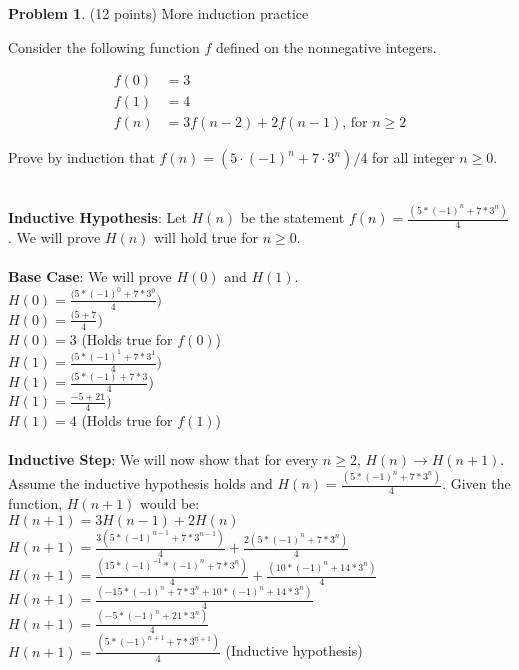 \documentclass[11pt]{article}
\theoremstyle{definition}
\theoremstyle{theorem}
\newtheorem{prob}{Problem}
\newcommand{\solution}[1]{\medskip\noindent{\color{DarkBlue}\textbf{Solution:}} #1}
\newcommand{\solution}[1]{}
\begin{document}
\newpage

\begin{prob}
  (12 points) More induction practice
\end{prob}

Consider the following function $f$ defined on the nonnegative integers.

\begin{align*}
	f(0) & = 3\\
	f(1) & = 4\\
	f(n) & = 3f(n-2) + 2f(n-1)\text{, for $n\ge 2$}
\end{align*}

Prove by induction that $f(n)= (5\cdot (-1)^n + 7\cdot 3^n) / 4$ for all integer $n\ge 0$.

\solution{
\\ \textbf{Inductive Hypothesis}: Let $H(n)$ be the statement $f(n) = \frac{(5 * (-1)^{n} + 7 * 3^{n})}{4}$. We will prove $H(n)$ will hold true for $n \ge 0$. \\\\
\textbf{Base Case}: We will prove $H(0)$ and $H(1)$. \\
$H(0) = \frac{(5 * (-1)^{0} + 7 * 3^{0}}{4})$ \\
$H(0) = \frac{(5 + 7}{4})$ \\
$H(0) = 3$ (Holds true for $f(0)$) \\
$H(1) = \frac{(5 * (-1)^{1} + 7 * 3^{1}}{4})$ \\
$H(1) = \frac{(5 * (-1) + 7 * 3}{4})$ \\
$H(1) = \frac{-5 + 21}{4})$ \\
$H(1) = 4$ (Holds true for $f(1)$) \\\\
\textbf{Inductive Step}: We will now show that for every $n \ge 2$, $H(n) \rightarrow H(n + 1)$. Assume the inductive hypothesis holds and $H(n) = \frac{(5 * (-1)^{n} + 7 * 3^{n})}{4}$. Given the function, $H(n + 1)$ would be: \\
$H(n + 1) = 3H(n - 1) + 2H(n)$ \\
$H(n + 1) = \frac{3(5 * (-1)^{n - 1} + 7 * 3^{n - 1})}{4} + \frac{2(5 * (-1)^{n} + 7 * 3^{n})}{4}$ \\
$H(n + 1) = \frac{(15 * (-1)^{-1} * (-1)^{n} + 7 * 3^{n})}{4} + \frac{(10 * (-1)^{n} + 14 * 3^{n})}{4}$ \\
$H(n + 1) = \frac{(-15 * (-1)^{n} + 7 * 3^{n} + 10 * (-1)^{n} + 14 * 3^{n})}{4}$ \\
$H(n + 1) = \frac{(-5 * (-1)^{n} + 21 * 3^{n})}{4}$ \\
$H(n + 1) = \frac{(5 * (-1)^{n + 1} + 7 * 3^{n + 1})}{4}$ (Inductive hypothesis)
}
\end{document}
